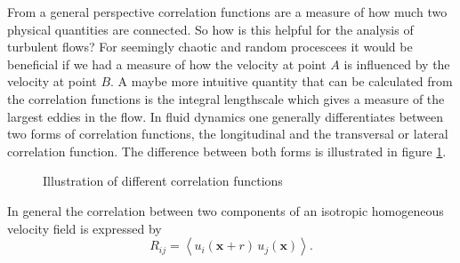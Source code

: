 \documentclass[preprint,12pt,ntfdMod]{elsarticle}
\begin{document}
\begin{par}

\label{sec:correlation}
From a general perspective correlation functions are a measure of how
much two physical quantities are connected. So how is this helpful for
the analysis of turbulent flows? For seemingly chaotic and random
procescees it would be beneficial if we had a measure of how the velocity
at point $A$ is influenced by the velocity at point $B$. A maybe more
intuitive quantity that can be calculated from the correlation functions
is the integral lengthscale which gives a measure of the largest
eddies in the flow. In fluid dynamics one generally differentiates
between two forms of correlation functions, the longitudinal and the
transversal or lateral correlation function. The difference between both forms is
illustrated in figure \ref{fig:correlations}.
\begin{figure}[t!]
        \centering
        \hfill
\caption{Illustration of different correlation functions}
\label{fig:correlations}
\end{figure}
In general the correlation between two components of an isotropic
homogeneous velocity field is expressed by
  \begin{equation}
      R_{ij} = \left<u_i(\mathbf{x}+r)\,u_j(\mathbf{x})\right>.

\end{equation}
\end{par}
\end{document}
